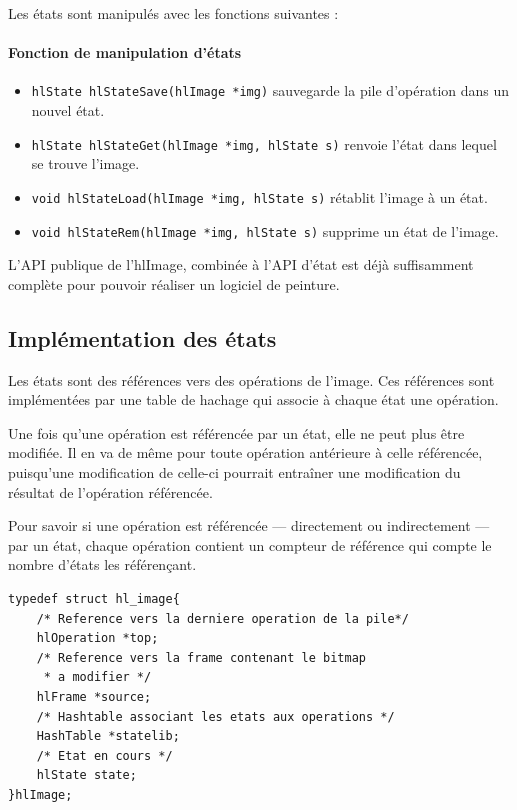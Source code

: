 		Les états sont manipulés avec les fonctions suivantes :
		\paragraph{Fonction de manipulation d'états}
		\begin{itemize}
			\item \lstinline$hlState hlStateSave(hlImage *img)$ sauvegarde la pile d'opération dans un nouvel état. 
			\item \lstinline$hlState hlStateGet(hlImage *img, hlState s)$ renvoie l'état dans lequel se trouve l'image.
			\item \lstinline$void hlStateLoad(hlImage *img, hlState s)$ rétablit l'image à un état. 
			\item \lstinline$void hlStateRem(hlImage *img, hlState s)$ supprime un état de l'image. 
		\end{itemize}

		L'API publique de l'hlImage, combinée à l'API d'état est déjà suffisamment complète pour pouvoir réaliser  un logiciel de peinture. 
		
		\subsection{Implémentation des états}
			Les états sont des références vers des opérations de l'image. Ces références sont implémentées par une table de hachage qui
			associe à chaque état une opération. 

			Une fois qu'une opération est référencée par un état, elle ne peut plus être modifiée. Il en va de même pour toute opération
			antérieure à celle référencée, puisqu'une modification de celle-ci pourrait entraîner une modification du résultat de l'opération 
			référencée.

			Pour savoir si une opération est référencée --- directement ou indirectement --- par un état, chaque opération contient un
			compteur de référence qui compte le nombre d'états les référençant. 

		\begin{lstlisting}[float,caption={Définition des hlImages avec états },frame=tb,label=lsthlImage2]
typedef struct hl_image{
	/* Reference vers la derniere operation de la pile*/
	hlOperation *top;
	/* Reference vers la frame contenant le bitmap 
	 * a modifier */
	hlFrame *source;
	/* Hashtable associant les etats aux operations */
	HashTable *statelib;
	/* Etat en cours */
	hlState state;
}hlImage;
		\end{lstlisting}

